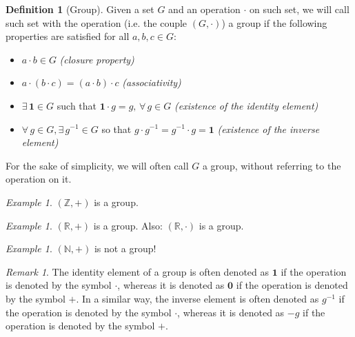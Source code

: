 \documentclass[a4paper,11pt,titlepage, article, oneside]{memoir}
\numberwithin{equation}{section}
\theoremstyle{definition}
\newtheorem{definition}[theorem]{Definition}
\theoremstyle{remark}
\newtheorem{remark}[theorem]{Remark}
\newtheorem{example}[theorem]{Example}
\begin{document}
\begin{definition} [Group] Given a set $G$ and an operation $\cdot$ on such set, we will call such set with the operation  (i.e. the couple $(G, \cdot)$) a group if the following properties are satisfied for all $a, b, c \in G$:
\begin{itemize}
\item $ a \cdot b \in G$ 
\hspace*{\fill}\textit{(closure property)}
\item $a \cdot (b \cdot c) = (a \cdot b) \cdot c$ 
\hspace*{\fill}\textit{(associativity)}
\item $\exists\, \mathbf{1} \in G$ such that $\mathbf{1} \cdot g = g, \, \forall\, g \in G$ 
\hspace*{\fill}\textit{(existence of the identity element)}
\item $\forall\, g \in G, \exists\, g^{-1} \in G$ so that $g \cdot g^{-1} = g^{-1} \cdot g = \mathbf{1}$ 
\hspace*{\fill} \textit{(existence of the inverse element)}
\end{itemize}
For the sake of simplicity, we will often call $G$ a group, without referring to the operation on it.
\end{definition}


\begin{tcolorbox}\begin{example}
$(\mathbb{Z}, +)$ is a group.
\end{example}\end{tcolorbox}

\begin{tcolorbox}\begin{example}
$(\mathbb{R}, +)$ is a group. Also: $(\mathbb{R}, \cdot)$ is a group.
\end{example}\end{tcolorbox}

\begin{tcolorbox}\begin{example}
$(\mathbb{N}, +)$ is not a group!
\end{example}\end{tcolorbox}

\begin{remarkbox}\begin{remark} \label{zeroone}
The identity element of a group is often denoted as $\mathbf{1}$ if the operation is denoted by the symbol $\cdot$, whereas it is denoted as $\mathbf{0}$ if the operation is denoted by the symbol $+$.
In a similar way, the inverse element is often denoted as $g^{-1}$ if the operation is denoted by the symbol $\cdot$, whereas it is denoted as $-g$ if the operation is denoted by the symbol $+$.

\end{remark}\end{remarkbox}
\end{document}
